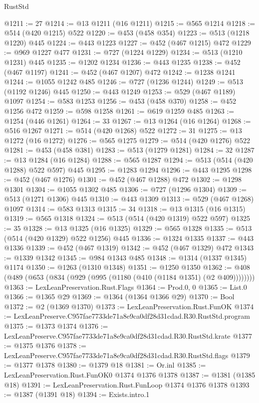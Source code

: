 \begin{lexlean}{RustStd}
\begin{coremodule}
@1211 := 27
@1214 := @13 @1211 (@16 @1211)
@1215 := @565 @1214
@1218 := @514 (@420 @1215) @522
@1220 := @453 (@458 @354)
@1223 := @513 (@1218 @1220) @445
@1224 := @443 @1223
@1227 := @452 (@467 @1215) @472
@1229 := @969 @1227 @477
@1231 := @727 (@1224 @1229)
@1234 := @513 (@1210 @1231) @445
@1235 := @1202 @1234
@1236 := @443 @1235
@1238 := @452 (@467 @1197)
@1241 := @452 (@467 @1207) @472
@1242 := @1238 @1241
@1244 := @1055 @1242 @485
@1246 := @727 (@1236 @1244)
@1249 := @513 (@1192 @1246) @445
@1250 := @443 @1249
@1253 := @529 (@467 @1189) @1097
@1254 := @583 @1253
@1256 := @453 (@458 @370)
@1258 := @452 @1256 @472
@1259 := @598 @1258
@1261 := @619 @1259 @485
@1263 := @1254 (@446 @1261)
@1264 := 33
@1267 := @13 @1264 (@16 @1264)
@1268 := @516 @1267
@1271 := @514 (@420 @1268) @522
@1272 := 31
@1275 := @13 @1272 (@16 @1272)
@1276 := @565 @1275
@1279 := @514 (@420 @1276) @522
@1281 := @453 (@458 @381)
@1283 := @513 (@1279 @1281)
@1284 := 32
@1287 := @13 @1284 (@16 @1284)
@1288 := @565 @1287
@1294 := @513 (@514 (@420 @1288) @522 @597) @445
@1295 := @1283 @1294
@1296 := @443 @1295
@1298 := @452 (@467 @1276)
@1301 := @452 (@467 @1288) @472
@1302 := @1298 @1301
@1304 := @1055 @1302 @485
@1306 := @727 (@1296 @1304)
@1309 := @513 (@1271 @1306) @445
@1310 := @443 @1309
@1313 := @529 (@467 @1268) @1097
@1314 := @583 @1313
@1315 := 34
@1318 := @13 @1315 (@16 @1315)
@1319 := @565 @1318
@1324 := @513 (@514 (@420 @1319) @522 @597)
@1325 := 35
@1328 := @13 @1325 (@16 @1325)
@1329 := @565 @1328
@1335 := @513 (@514 (@420 @1329) @522 @1256) @445
@1336 := @1324 @1335
@1337 := @443 @1336
@1339 := @452 (@467 @1319)
@1342 := @452 (@467 @1329) @472
@1343 := @1339 @1342
@1345 := @984 @1343 @485
@1348 := @1314 (@1337 @1345) @1174
@1350 := @1263 (@1310 @1348)
@1351 := @1250 @1350
@1362 := @408 (@489 (@653 (@834 (@929 (@995 (@1180 (@410 (@1184 @1351) (@2 @409))))))))
@1363 := LexLeanPreservation.Rust.Flags
@1364 := Prod.{0, 0}
@1365 := List.{0}
@1366 := @1365 @29
@1369 := @1364 (@1364 @1366 @29)
@1370 := Bool
@1372 := @2 (@1369 @1370)
@1373 := LexLeanPreservation.Rust.FunOK
@1374 := LexLeanPreserve.C957fae7733de71a8e9ca0df28d31cdad.R30.RustStd.program
@1375 := @1373 @1374
@1376 := LexLeanPreserve.C957fae7733de71a8e9ca0df28d31cdad.R30.RustStd.krate
@1377 := @1375 @1376
@1378 := LexLeanPreserve.C957fae7733de71a8e9ca0df28d31cdad.R30.RustStd.flags
@1379 := @1377 @1378
@1380 := @1379 @18
@1381 := Or.inl
@1385 := LexLeanPreservation.Rust.FunOK0 @1374 @1376 @1378
@1387 := @1381 (@1385 @18)
@1391 := LexLeanPreservation.Rust.FunLoop @1374 @1376 @1378
@1393 := @1387 (@1391 @18)
@1394 := Exists.intro.{1}

\end{coremodule}
\end{lexlean}
